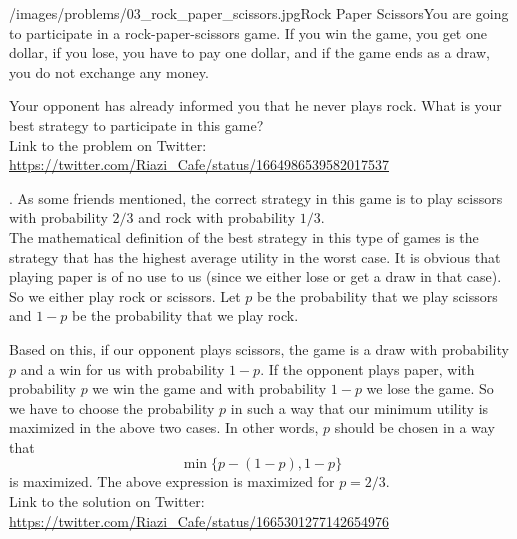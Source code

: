 \begin{problem}{/images/problems/03_rock_paper_scissors.jpg}{Rock Paper Scissors}You are going to participate in a rock-paper-scissors game. If you win the game, you get one dollar, if you lose, you have to pay one dollar, and if the game ends as a draw, you do not exchange any money.

Your opponent has already informed you that he never plays rock. What is your best strategy to participate in this game?\\[0.2cm]

Link to the problem on Twitter:  \url{https://twitter.com/Riazi_Cafe/status/1664986539582017537}\end{problem}
\begin{solution}.
As some friends mentioned, the correct strategy in this game is to play scissors with probability $2/3$ and rock with probability $1/3$.\\[0.2cm]

The mathematical definition of the best strategy in this type of games is the strategy that has the highest average utility in the worst case. It is obvious that playing paper is of no use to us (since we either lose or get a draw in that case). So we either play rock or scissors. Let $p$ be the probability that we play scissors and $1-p$ be the probability that we play rock.

Based on this, if our opponent plays scissors, the game is a draw with probability $p$ and a win for us with probability $1-p$. If the opponent plays paper, with probability $p$ we win the game and with probability $1-p$ we lose the game. So we have to choose the probability $p$ in such a way that our minimum utility is maximized in the above two cases. In other words, $p$ should be chosen in  a way that
$$\min\{p-(1-p), 1-p\}$$
is maximized. The above expression is maximized for $p =  2/3$.\\[0.2cm]

Link to the solution on Twitter:  \url{https://twitter.com/Riazi_Cafe/status/1665301277142654976}\end{solution}

